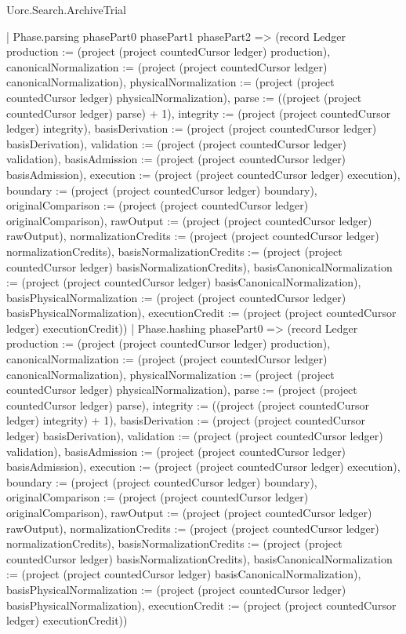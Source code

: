 \begin{lexlean}{Uorc.Search.ArchiveTrial}
\begin{semanticmodule}
{{      | Phase.parsing phasePart0 phasePart1 phasePart2 => (record Ledger {production := (project (project countedCursor ledger) production), canonicalNormalization := (project (project countedCursor ledger) canonicalNormalization), physicalNormalization := (project (project countedCursor ledger) physicalNormalization), parse := ((project (project countedCursor ledger) parse) + 1), integrity := (project (project countedCursor ledger) integrity), basisDerivation := (project (project countedCursor ledger) basisDerivation), validation := (project (project countedCursor ledger) validation), basisAdmission := (project (project countedCursor ledger) basisAdmission), execution := (project (project countedCursor ledger) execution), boundary := (project (project countedCursor ledger) boundary), originalComparison := (project (project countedCursor ledger) originalComparison), rawOutput := (project (project countedCursor ledger) rawOutput), normalizationCredits := (project (project countedCursor ledger) normalizationCredits), basisNormalizationCredits := (project (project countedCursor ledger) basisNormalizationCredits), basisCanonicalNormalization := (project (project countedCursor ledger) basisCanonicalNormalization), basisPhysicalNormalization := (project (project countedCursor ledger) basisPhysicalNormalization), executionCredit := (project (project countedCursor ledger) executionCredit)})
      | Phase.hashing phasePart0 => (record Ledger {production := (project (project countedCursor ledger) production), canonicalNormalization := (project (project countedCursor ledger) canonicalNormalization), physicalNormalization := (project (project countedCursor ledger) physicalNormalization), parse := (project (project countedCursor ledger) parse), integrity := ((project (project countedCursor ledger) integrity) + 1), basisDerivation := (project (project countedCursor ledger) basisDerivation), validation := (project (project countedCursor ledger) validation), basisAdmission := (project (project countedCursor ledger) basisAdmission), execution := (project (project countedCursor ledger) execution), boundary := (project (project countedCursor ledger) boundary), originalComparison := (project (project countedCursor ledger) originalComparison), rawOutput := (project (project countedCursor ledger) rawOutput), normalizationCredits := (project (project countedCursor ledger) normalizationCredits), basisNormalizationCredits := (project (project countedCursor ledger) basisNormalizationCredits), basisCanonicalNormalization := (project (project countedCursor ledger) basisCanonicalNormalization), basisPhysicalNormalization := (project (project countedCursor ledger) basisPhysicalNormalization), executionCredit := (project (project countedCursor ledger) executionCredit)})
}}
\end{semanticmodule}
\end{lexlean}

